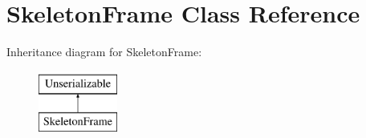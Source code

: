 \hypertarget{class_skeleton_frame}{\section{\-Skeleton\-Frame \-Class \-Reference}
\label{class_skeleton_frame}
}
\-Inheritance diagram for \-Skeleton\-Frame\-:\begin{figure}[H]
\begin{center}
\leavevmode
\includegraphics[height=2.000000cm]{class_skeleton_frame}
\end{center}
\end{figure}
